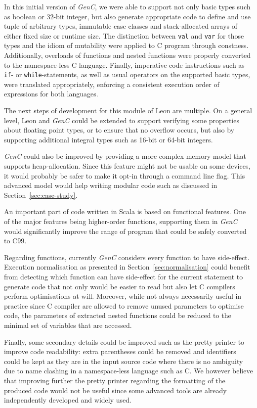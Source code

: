 \documentclass{article}
\newcommand{\inlinecode}[1]{\lstinline[basicstyle=\ttfamily]|#1|}
\newcommand{\inlineScala}[1]{\lstinline[language=MyScala]|#1|}
\newcommand{\GenC}{\emph{GenC}\xspace}
\begin{document}
In this initial version of \GenC, we were able to support not only basic types
such as boolean or 32-bit integer, but also generate appropriate code to define
and use tuple of arbitrary types, immutable case classes and stack-allocated
arrays of either fixed size or runtime size. The distinction between
\inlineScala{val} and \inlineScala{var} for those types and the idiom of
mutability were applied to C program through constness. Additionally, overloads
of functions and nested functions were properly converted to the namespace-less
C language. Finally, imperative code instructions such as \inlinecode{if}- or
\inlinecode{while}-statements, as well as usual operators on the supported basic
types, were translated appropriately, enforcing a consistent execution order of
expressions for both languages.

The next steps of development for this module of Leon are multiple. On a general
level, Leon and \GenC could be extended to support verifying some properties
about floating point types, or to ensure that no overflow occurs, but also by
supporting additional integral types such as 16-bit or 64-bit integers.

\GenC could also be improved by providing a more complex memory model that
supports heap-allocation. Since this feature might not be usable on some
devices, it would probably be safer to make it opt-in through a command line
flag. This advanced model would help writing modular code such as discussed in
Section~\ref{sec:case-study}.

An important part of code written in Scala is based on functional features. One
of the major features being higher-order functions, supporting them in \GenC
would significantly improve the range of program that could be safely converted
to C99.

Regarding functions, currently \GenC considers every function to have
side-effect. Execution normalisation as presented in
Section~\ref{sec:normalisation} could benefit from detecting which function can
have side-effect for the current statement to generate code that not only would
be easier to read but also let C compilers perform optimisations at will.
Moreover, while not always necessarily useful in practice since C compiler are
allowed to remove unused parameters to optimise code, the parameters of
extracted nested functions could be reduced to the minimal set of variables that
are accessed.

Finally, some secondary details could be improved such as the pretty printer to
improve code readability: extra parentheses could be removed and identifiers
could be kept as they are in the input source code where there is no ambiguity
due to name clashing in a namespace-less language such as C. We however believe
that improving further the pretty printer regarding the formatting of the
produced code would not be useful since some advanced tools are already
independently developed and widely used.
\end{document}
